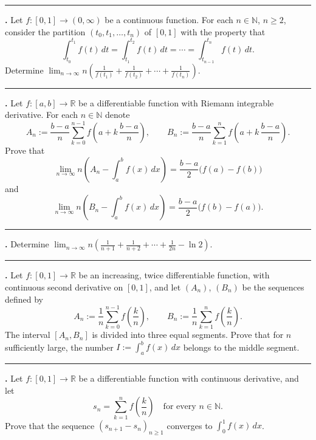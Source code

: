 \documentclass[11pt]{article}
\newcounter{probnum}
\newenvironment{problembox}{\par\noindent\rule{\linewidth}{0.5pt}\vspace{5pt}\par}{\vspace{2pt}}
\begin{document}
\begin{problembox}
\textbf{\theprobnum.} Let $f : [0,1] \to (0,\infty)$ be a continuous function. For each $n \in \mathbb{N}$, $n \ge 2$, consider the partition $(t_0,t_1,\ldots,t_n)$ of $[0,1]$ with the property that
\[
\int_{t_0}^{t_1} f(t)\,dt = \int_{t_1}^{t_2} f(t)\,dt = \cdots = \int_{t_{n-1}}^{t_n} f(t)\,dt.
\]
Determine $\displaystyle\lim_{n \to \infty} n \left(\frac{1}{f(t_1)} + \frac{1}{f(t_2)} + \cdots + \frac{1}{f(t_n)}\right)$.
\end{problembox}

\begin{problembox}
\textbf{\theprobnum.} Let $f : [a,b] \to \mathbb{R}$ be a differentiable function with Riemann integrable derivative. For each $n \in \mathbb{N}$ denote
\[
A_n := \frac{b-a}{n} \sum_{k=0}^{n-1} f\left(a + k\,\frac{b-a}{n}\right), \qquad B_n := \frac{b-a}{n} \sum_{k=1}^{n} f\left(a + k\,\frac{b-a}{n}\right).
\]
Prove that
\[
\lim_{n \to \infty} n \left(A_n - \int_a^b f(x)\,dx\right) = \frac{b-a}{2}\big(f(a) - f(b)\big)
\]
and
\[
\lim_{n \to \infty} n \left(B_n - \int_a^b f(x)\,dx\right) = \frac{b-a}{2}\big(f(b) - f(a)\big).
\]
\end{problembox}

\begin{problembox}
\textbf{\theprobnum.} Determine $\displaystyle\lim_{n \to \infty} n \left(\frac{1}{n+1} + \frac{1}{n+2} + \cdots + \frac{1}{2n} - \ln 2\right)$.
\end{problembox}

\begin{problembox}
\textbf{\theprobnum.} Let $f : [0,1] \to \mathbb{R}$ be an increasing, twice differentiable function, with continuous second derivative on $[0,1]$, and let $(A_n)$, $(B_n)$ be the sequences defined by
\[
A_n := \frac{1}{n} \sum_{k=0}^{n-1} f\left(\frac{k}{n}\right), \qquad B_n := \frac{1}{n} \sum_{k=1}^{n} f\left(\frac{k}{n}\right).
\]
The interval $[A_n, B_n]$ is divided into three equal segments. Prove that for $n$ sufficiently large, the number $I := \displaystyle\int_a^b f(x)\,dx$ belongs to the middle segment.
\end{problembox}

\begin{problembox}
\textbf{\theprobnum.} Let $f : [0,1] \to \mathbb{R}$ be a differentiable function with continuous derivative, and let
\[
s_n = \sum_{k=1}^{n} f\left(\frac{k}{n}\right) \quad \text{for every } n \in \mathbb{N}.
\]
Prove that the sequence $(s_{n+1} - s_n)_{n \ge 1}$ converges to $\displaystyle\int_0^1 f(x)\,dx$.
\end{problembox}
\end{document}
